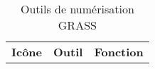 \begin{table}[h]
\centering
\caption{Outils de numérisation GRASS}\label{tab:grass_tools}\medskip
 \begin{tabular}{|l|l|p{5in}|}
\hline \textbf{Icône} & \textbf{Outil} & \textbf{Fonction} \\

\end{tabular}
\end{table}
